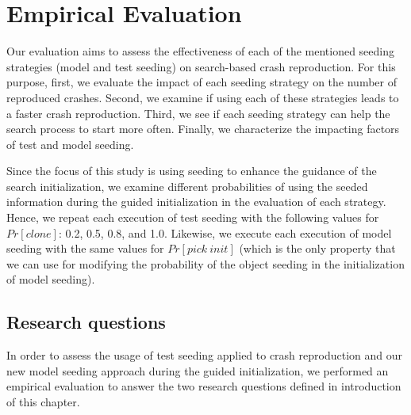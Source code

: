  
\section{Empirical Evaluation}\label{sec:model_seeding:setup}

Our evaluation aims to assess the effectiveness of each of the mentioned seeding strategies (model and test seeding) on search-based crash reproduction.
For this purpose, first, we evaluate the impact of each seeding strategy on the number of reproduced crashes. Second, we examine if using each of these strategies leads to a faster crash reproduction. Third, we see if each seeding strategy can help the search process to start more often. Finally, we characterize the impacting factors of test and model seeding.

Since the focus of this study is using seeding to enhance the guidance of the search initialization, we examine different probabilities of using the seeded information during the guided initialization in the evaluation of each strategy. Hence, we repeat each execution of test seeding with the following values for $Pr[clone]$: 0.2, 0.5, 0.8, and 1.0. Likewise, we execute each execution of model seeding with the same values for $Pr[pick\ init]$ (which is the only property that we can use for modifying the probability of the object seeding in the initialization of model seeding).


\subsection{Research questions}
\label{sec:model_seeding:setup:rqs}

In order to assess the usage of test seeding applied to crash reproduction and our new model seeding approach during the guided initialization, we performed an empirical evaluation to answer the two research questions defined in introduction of this chapter.

